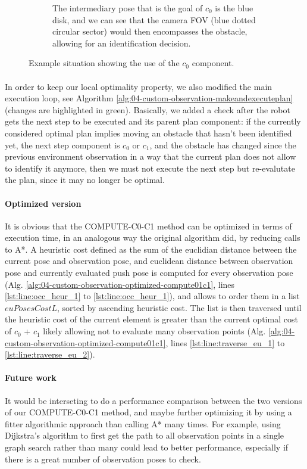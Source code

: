 \begin{figure}[H]
\begin{subfigure}{.48\textwidth}
  \caption{The intermediary pose that is the goal of $c_{0}$ is the blue disk, and we can see that the camera FOV (blue dotted circular sector) would then encompasses the obstacle, allowing for an identification decision.}
  \label{fig:observation_02}
\end{subfigure}
\caption{Example situation showing the use of the $c_{0}$ component.}
\label{fig:observation_example}
\end{figure}

\paragraph{} In order to keep our local optimality property, we also modified the main execution loop, see Algorithm \ref{alg:04-custom-observation-makeandexecuteplan} (changes are highlighted in green). Basically, we added a check after the robot gets the next step to be executed and its parent plan component: if the currently considered optimal plan implies moving an obstacle that hasn't been identified yet, the next step component is $c_{0}$ or $c_{1}$, and the obstacle has changed since the previous environment observation in a way that the current plan does not allow to identify it anymore, then we must not execute the next step but re-evalutate the plan, since it may no longer be optimal.

\paragraph{Optimized version} It is obvious that the COMPUTE-C0-C1 method can be optimized in terms of execution time, in an analogous way the original algorithm did, by reducing calls to A*. A heuristic cost defined as the sum of the euclidian distance between the current pose and observation pose, and euclidean distance between observation pose and currently evaluated push pose is computed for every observation pose (Alg. \ref{alg:04-custom-observation-optimized-compute01c1}, lines \ref{lst:line:occ_heur_1} to \ref{lst:line:occ_heur_1}), and allows to order them in a list $euPosesCostL$, sorted by ascending heuristic cost. The list is then traversed until the heuristic cost of the current element is greater than the current optimal cost of $c_{0}$ + $c_{1}$ likely allowing not to evaluate many observation points (Alg. \ref{alg:04-custom-observation-optimized-compute01c1}, lines \ref{lst:line:traverse_eu_1} to \ref{lst:line:traverse_eu_2}).

\paragraph{Future work} It would be interseting to do a performance comparison between the two versions of our COMPUTE-C0-C1 method, and maybe further optimizing it by using a fitter algorithmic approach than calling A* many times. For example, using Dijkstra's algorithm to first get the path to all observation points in a single graph search rather than many could lead to better performance, especially if there is a great number of observation poses to check.


